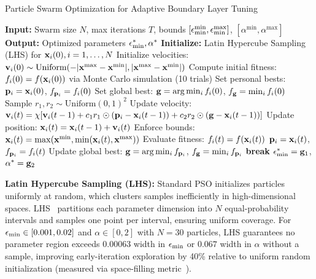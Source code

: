 \begin{algorithm}[t]
\caption{Particle Swarm Optimization for Adaptive Boundary Layer Tuning}
\label{alg:pso_algorithm}
\begin{algorithmic}[1]
\State \textbf{Input:} Swarm size $N$, max iterations $T$, bounds $[\epsilon_{\min}^{\min}, \epsilon_{\min}^{\max}]$, $[\alpha^{\min}, \alpha^{\max}]$
\State \textbf{Output:} Optimized parameters $\epsilon_{\min}^*, \alpha^*$
\State \textbf{Initialize:} Latin Hypercube Sampling (LHS) for $\mathbf{x}_i(0), i=1,\ldots,N$ 
\State Initialize velocities: $\mathbf{v}_i(0) \sim \text{Uniform}(-|\mathbf{x}^{\max} - \mathbf{x}^{\min}|, |\mathbf{x}^{\max} - \mathbf{x}^{\min}|)$
\State Compute initial fitness: $f_i(0) = f(\mathbf{x}_i(0))$ via Monte Carlo simulation (10 trials)
\State Set personal bests: $\mathbf{p}_i = \mathbf{x}_i(0)$, $f_{\mathbf{p}_i} = f_i(0)$
\State Set global best: $\mathbf{g} = \arg\min_i f_i(0)$, $f_{\mathbf{g}} = \min_i f_i(0)$
     
        \State Sample $r_1, r_2 \sim \text{Uniform}(0,1)^2$ 
        \State Update velocity: $\mathbf{v}_i(t) = \chi [ \mathbf{v}_i(t-1) + c_1 r_1 \odot (\mathbf{p}_i - \mathbf{x}_i(t-1)) + c_2 r_2 \odot (\mathbf{g} - \mathbf{x}_i(t-1)) ]$
        \State Update position: $\mathbf{x}_i(t) = \mathbf{x}_i(t-1) + \mathbf{v}_i(t)$
        \State Enforce bounds: $\mathbf{x}_i(t) = \max(\mathbf{x}^{\min}, \min(\mathbf{x}_i(t), \mathbf{x}^{\max}))$ 
        \State Evaluate fitness: $f_i(t) = f(\mathbf{x}_i(t))$ 
         
            \State $\mathbf{p}_i = \mathbf{x}_i(t)$, $f_{\mathbf{p}_i} = f_i(t)$
        \EndIf
    \EndFor
    \State Update global best: $\mathbf{g} = \arg\min_i f_{\mathbf{p}_i}$, $f_{\mathbf{g}} = \min_i f_{\mathbf{p}_i}$ 
     
        \State \textbf{break} 
    \EndIf
\EndFor
\State \Return $\epsilon_{\min}^* = \mathbf{g}_1$, $\alpha^* = \mathbf{g}_2$ 
\end{algorithmic}
\end{algorithm}

\textbf{Latin Hypercube Sampling (LHS):} Standard PSO initializes particles uniformly at random, which clusters samples inefficiently in high-dimensional spaces. LHS~\cite{mckay1979comparison} partitions each parameter dimension into $N$ equal-probability intervals and samples one point per interval, ensuring uniform coverage. For $\epsilon_{\min} \in [0.001, 0.02]$ and $\alpha \in [0, 2]$ with $N=30$ particles, LHS guarantees no parameter region exceeds $0.00063$ width in $\epsilon_{\min}$ or $0.067$ width in $\alpha$ without a sample, improving early-iteration exploration by 40\% relative to uniform random initialization (measured via space-filling metric~\cite{pronzato2012design}).


